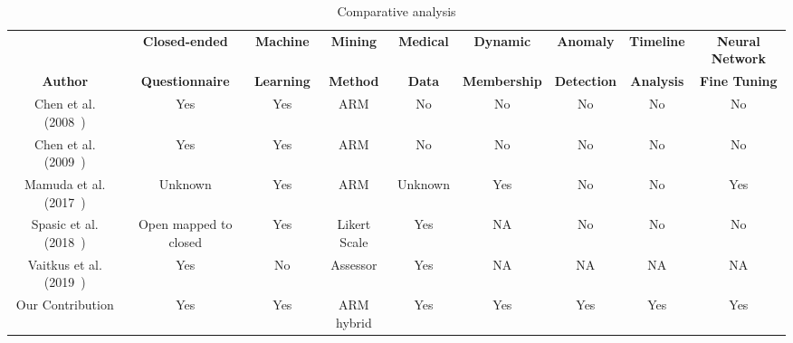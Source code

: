 \begin{landscape}
    \begin{table}[htbp]
        \caption{Comparative analysis}
        \label{tab:TBL_Comparative_Analisys}
        \centering
        \small
        \setlength\tabcolsep{2pt}
        \begin{tabular}{|c|c|c|c|c|c|c|c|c|}
            \hline
                                                          & \textbf{Closed-ended}  & \textbf{Machine}  & \textbf{Mining} & \textbf{Medical} & \textbf{Dynamic}    & \textbf{Anomaly}   & \textbf{Timeline} & \textbf{Neural Network} \\
            \textbf{Author}                               & \textbf{Questionnaire} & \textbf{Learning} & \textbf{Method} & \textbf{Data}    & \textbf{Membership} & \textbf{Detection} & \textbf{Analysis} & \textbf{Fine Tuning}    \\
            \hline
            Chen et al. (2008~\cite{chen2008mining})      & Yes                    & Yes               & ARM             & No               & No                  & No                 & No                & No                      \\
            \hline
            Chen et al. (2009~\cite{chen2009mining})      & Yes                    & Yes               & ARM             & No               & No                  & No                 & No                & No                      \\
            \hline
            Mamuda et al. (2017~\cite{mamuda2017fusion})  & Unknown                & Yes               & ARM             & Unknown          & Yes                 & No                 & No                & Yes                     \\
            \hline
            Spasic et al. (2018~\cite{spasic2018closing}) & Open mapped to closed  & Yes               & Likert Scale    & Yes              & NA                  & No                 & No                & No                      \\
            \hline
            Vaitkus et al. (2019~\cite{vaitkus2019kamst}) & Yes                    & No                & Assessor        & Yes              & NA                  & NA                 & NA                & NA                      \\
            \hline
            Our Contribution                              & Yes                    & Yes               & ARM hybrid      & Yes              & Yes                 & Yes                & Yes               & Yes                     \\
            \hline
        \end{tabular}
    \end{table}
\end{landscape}
